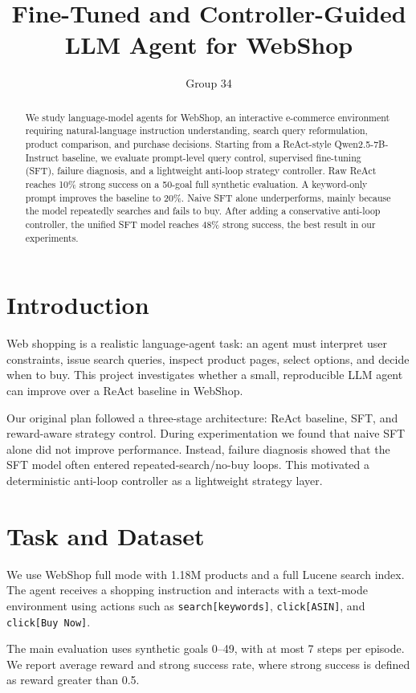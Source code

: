 \documentclass[11pt]{article}
\title{Fine-Tuned and Controller-Guided LLM Agent for WebShop}
\author{Group 34}
\date{}
\begin{document}
\maketitle

\begin{abstract}
We study language-model agents for WebShop, an interactive e-commerce environment requiring natural-language instruction understanding, search query reformulation, product comparison, and purchase decisions. Starting from a ReAct-style Qwen2.5-7B-Instruct baseline, we evaluate prompt-level query control, supervised fine-tuning (SFT), failure diagnosis, and a lightweight anti-loop strategy controller. Raw ReAct reaches 10\% strong success on a 50-goal full synthetic evaluation. A keyword-only prompt improves the baseline to 20\%. Naive SFT alone underperforms, mainly because the model repeatedly searches and fails to buy. After adding a conservative anti-loop controller, the unified SFT model reaches 48\% strong success, the best result in our experiments.
\end{abstract}

\section{Introduction}
Web shopping is a realistic language-agent task: an agent must interpret user constraints, issue search queries, inspect product pages, select options, and decide when to buy. This project investigates whether a small, reproducible LLM agent can improve over a ReAct baseline in WebShop.

Our original plan followed a three-stage architecture: ReAct baseline, SFT, and reward-aware strategy control. During experimentation we found that naive SFT alone did not improve performance. Instead, failure diagnosis showed that the SFT model often entered repeated-search/no-buy loops. This motivated a deterministic anti-loop controller as a lightweight strategy layer.

\section{Task and Dataset}
We use WebShop full mode with 1.18M products and a full Lucene search index. The agent receives a shopping instruction and interacts with a text-mode environment using actions such as \texttt{search[keywords]}, \texttt{click[ASIN]}, and \texttt{click[Buy Now]}.

The main evaluation uses synthetic goals 0--49, with at most 7 steps per episode. We report average reward and strong success rate, where strong success is defined as reward greater than 0.5.
\end{document}
